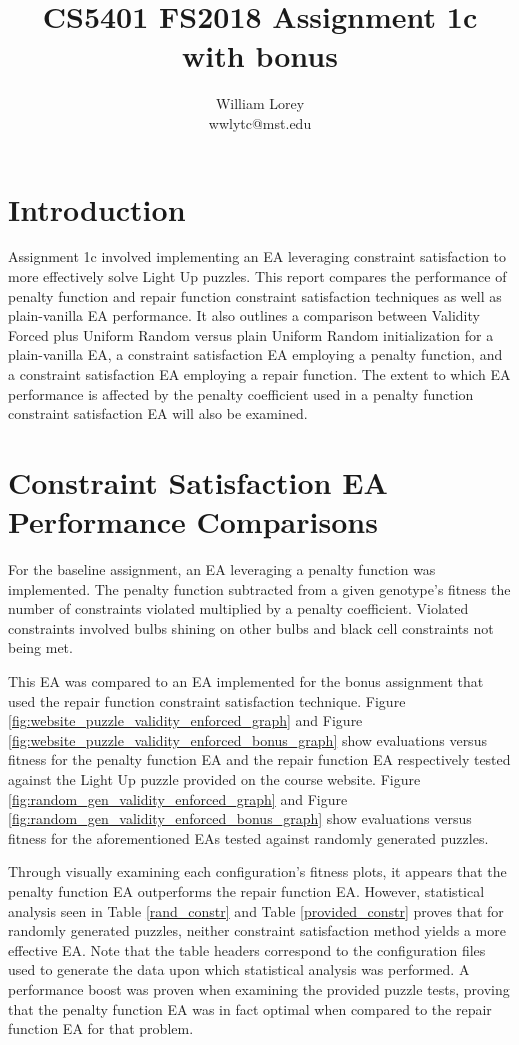 \documentclass[11pt]{article}
\title{CS5401 FS2018 Assignment 1c with bonus}
\author{William  Lorey \\ wwlytc@mst.edu}
\date{}
\begin{document}
\maketitle

\tableofcontents


\section{Introduction}

Assignment 1c involved implementing an EA leveraging constraint satisfaction to
more effectively solve Light Up puzzles. This report compares the performance of
penalty function and repair function constraint satisfaction techniques as well as
plain-vanilla EA performance. It also outlines a comparison between Validity Forced plus 
Uniform Random versus plain Uniform Random initialization for a plain-vanilla EA,
a constraint satisfaction EA employing a penalty function, and a constraint satisfaction
EA employing a repair function. The extent to which EA performance is affected by 
the penalty coefficient used in a penalty function constraint satisfaction EA will also be examined.


\section{Constraint Satisfaction EA Performance Comparisons}

For the baseline assignment, an EA leveraging a penalty function was implemented. The penalty function
subtracted from a given genotype's fitness the number of constraints violated multiplied by a
penalty coefficient. Violated constraints involved bulbs shining on other bulbs and black cell
constraints not being met.

This EA was compared to an EA implemented for the bonus assignment that used the repair function
constraint satisfaction technique. Figure \ref{fig:website_puzzle_validity_enforced_graph} and Figure 
\ref{fig:website_puzzle_validity_enforced_bonus_graph} show evaluations versus fitness for the 
penalty function EA and the repair function EA respectively tested against the Light Up puzzle provided
on the course website. Figure \ref{fig:random_gen_validity_enforced_graph} and Figure \ref{fig:random_gen_validity_enforced_bonus_graph} 
show evaluations versus fitness for the aforementioned EAs tested against randomly generated puzzles.

Through visually examining each configuration's fitness plots, it appears that the penalty function EA 
outperforms the repair function EA. However, statistical analysis seen in Table \ref{rand_constr} and Table \ref{provided_constr}
proves that for randomly generated puzzles, neither constraint satisfaction method yields a more effective EA. Note that the table
headers correspond to the configuration files used to generate the data upon which statistical analysis was performed.
A performance boost was proven when examining the provided puzzle tests, proving that the penalty function EA was in fact
optimal when compared to the repair function EA for that problem. 
\end{document}
